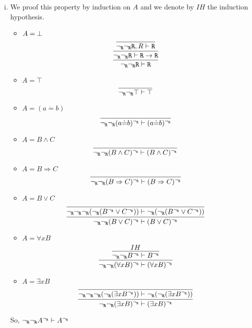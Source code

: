 \begin{enumerate}[(i)]
     \item We proof this property by induction on $A$ and we denote by $IH$ the induction hypothesis.
    \begin{itemize}
        \item $A=\bot$
            $$
                \infer{
                   \ngr\ngr\R \vdash \R
                }{
                    \infer{
                        \ngr\ngr\R \vdash \R \rightarrow \R
                    }{
                        \infer{
                        \ngr\ngr\R, R \vdash \R
                        }{}
                    }
                }
            $$
        \item $A=\top$
            $$
                \infer{
                     \ngr\ngr\top \vdash \top
                }{}
            $$
        \item $A=(a\dot{=}b)$
            $$
                \infer{
                     \ngr\ngr(a\dot{=}b)^\ngr \vdash (a\dot{=}b)^\ngr
                }{
                }
            $$
        \item $A=B\wedge C$
            $$
                \infer{
                    \ngr\ngr(B\wedge C)^\ngr \vdash (B\wedge C)^\ngr
                }{
                }
            $$
        \item $A=B \Rightarrow C$
            $$
                \infer{
                    \ngr\ngr(B \Rightarrow C)^\ngr \vdash (B \Rightarrow C)^\ngr
                }{
                }
            $$
        \item $A=B \vee C$
            $$
                \infer{
                    \ngr\ngr(B \vee C)^\ngr \vdash (B \vee C)^\ngr
                }{
                    \infer{
                        \ngr\ngr\ngr(\ngr(B^\ngr \vee C^\ngr)) \vdash \ngr(\ngr(B^\ngr \vee C^\ngr))
                    }{
                    }
                }
            $$
        \item $A=\forall x B$
            $$
                \infer{
                    \ngr\ngr(\forall x B)^\ngr \vdash (\forall x B)^\ngr
                }{
                    \infer{
                        \ngr\ngr B^\ngr \vdash B^\ngr
                    }{
                       IH
                    }
                }
            $$
        \item $A=\exists x B$
            $$
                \infer{
                    \ngr\ngr(\exists x B)^\ngr \vdash (\exists x B)^\ngr
                }{
                    \infer{
                        \ngr\ngr\ngr(\ngr(\exists x B^\ngr)) \vdash \ngr(\ngr(\exists x B^\ngr))
                    }{
                    }
                }
            $$
    \end{itemize}
    So, ${\neg_{\texttt{R}}}{\neg_{\texttt{R}}} A^{\neg_{\texttt{R}}} \vdash A^{\neg_{\texttt{R}}}$
\end{enumerate}